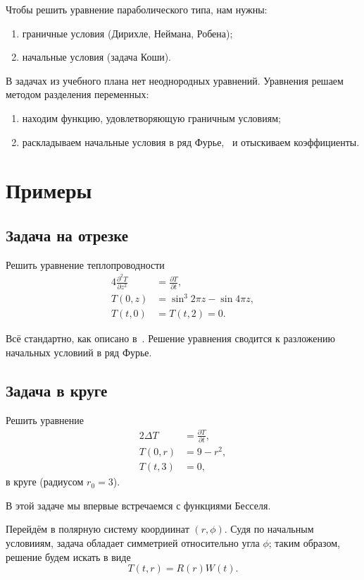 \documentclass[12pt]{report}
\begin{document}
Чтобы решить уравнение параболического типа, нам нужны:
\begin{enumerate}
	\item граничные условия (Дирихле, Неймана, Робена);
	\item начальные условия (задача Коши).
\end{enumerate}

В задачах из учебного плана нет неоднородных уравнений. Уравнения решаем методом разделения переменных:~\cite{diffusion-equation}
\begin{enumerate}
	\item находим функцию, удовлетворяющую граничным условиям;
	\item раскладываем начальные условия в ряд Фурье,~\cite{Fourier-series} и отыскиваем коэффициенты.
\end{enumerate}


\section{Примеры}
\subsection{Задача на отрезке}
Решить уравнение теплопроводности
\begin{align*}
	4\frac{\partial^2T}{\partial z^2} &= \frac{\partial T}{\partial t}, \\
	T(0, z) &= \sin^3 2\pi z - \sin 4\pi z,\\
	T(t,0) &= T(t,2) =0.
\end{align*}

Всё стандартно, как описано в~\cite{diffusion-equation}. Решение уравнения сводится к разложению начальных условиий в ряд Фурье.

\subsection{Задача в круге}
Решить уравнение
\begin{align}
2\Delta T &= \frac{\partial T}{\partial t}, \label{eq:circle}\\
T(0, r) &= 9 - r^2,\\
T(t,3) &=0,
\end{align}
в круге (радиусом $r_0 = 3$).

В этой задаче мы впервые встречаемся с функциями Бесселя.

Перейдём в полярную систему коордиинат $(r,\phi)$. Судя по начальным условииям, задача обладает симметрией относительно угла $\phi$; таким образом, решение будем искать в виде 
\[
T(t,r) = R(r)W(t).
\]
\end{document}
